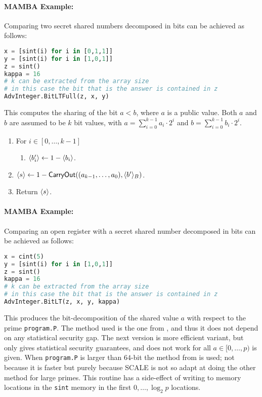   \paragraph{MAMBA Example:} Comparing two secret shared numbers decomposed in bits can be achieved as follows:
  \begin{lstlisting}[language={python}]
x = [sint(i) for i in [0,1,1]]
y = [sint(i) for i in [1,0,1]]
z = sint()
kappa = 16
# k can be extracted from the array size
# in this case the bit that is the answer is contained in z
AdvInteger.BitLTFull(z, x, y)
\end{lstlisting}

  This computes the sharing of the bit $a<b$, where $a$ is a public value.
  Both $a$ and $b$ are assumed to be $k$ bit values, with
$a=\sum_{i=0}^{k-1} a_i \cdot 2^i$ and
$b=\sum_{i=0}^{k-1} b_i \cdot 2^i$.
  \begin{enumerate}
    \item For $i \in [0,\ldots,k-1]$
          \begin{enumerate}
            \item $\langle b_i' \rangle\leftarrow 1-\langle b_i \rangle$.
          \end{enumerate}
    \item $\langle s \rangle \leftarrow 1-
            \mathsf{CarryOut}((a_{k-1},\ldots,a_0),\langle b' \rangle_B)$.
    \item Return $\langle s \rangle$.
  \end{enumerate}
  \paragraph{MAMBA Example:} Comparing an open register with a secret shared number decomposed in bits can be achieved as follows:
  \begin{lstlisting}[language={python}]
x = cint(5)
y = [sint(i) for i in [1,0,1]]
z = sint()
kappa = 16
# k can be extracted from the array size
# in this case the bit that is the answer is contained in z
AdvInteger.BitLT(z, x, y, kappa)
\end{lstlisting}


  This produces the bit-decomposition of the shared value $a$ with
  respect to the prime \verb+program.P+.
  The method used is the one from \cite{DBLP:conf/pkc/NishideO07},
  and thus it does not depend on any statistical security gap.
  The next version is more efficient variant, but only
  gives statistical security guarantees, and does not
  work for all $a \in [0,\ldots,p)$ is given.
  When \verb+program.P+ is larger than $64$-bit the
  method from \cite{DFKNT06} is used; not because it is
  faster but purely because SCALE is not so adapt at doing
  the other method for large primes.
  This routine has a side-effect of writing to memory locations in the
  \verb+sint+ memory in the first $0,\ldots,\log_2 p$ locations.
